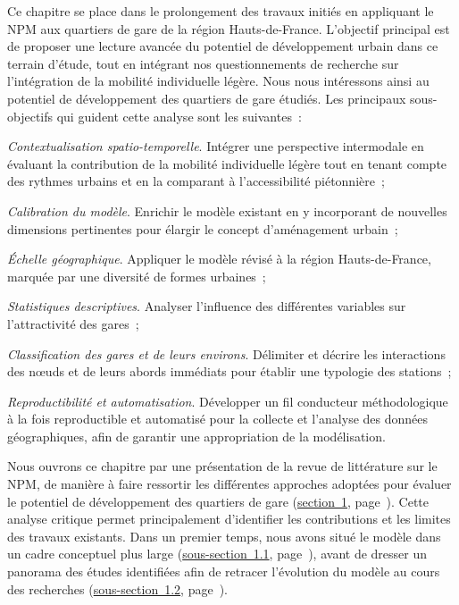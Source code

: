 \begin{refsegment}
Ce chapitre se place dans le prolongement des travaux initiés en appliquant le \acrshort{NPM} aux quartiers de gare de la région Hauts-de-France. L’objectif principal est de proposer une lecture avancée du potentiel de développement urbain dans ce terrain d'étude, tout en intégrant nos questionnements de recherche sur l’intégration de la mobilité individuelle légère. Nous nous intéressons ainsi au potentiel de développement des quartiers de gare étudiés. Les principaux sous-objectifs qui guident cette analyse sont les suivantes~:
\begin{customitemize}
    \item \textsl{Contextualisation spatio-temporelle}. Intégrer une perspective intermodale en évaluant la contribution de la mobilité individuelle légère tout en tenant compte des rythmes urbains et en la comparant à l’accessibilité piétonnière~;
    \item \textsl{Calibration du modèle}. Enrichir le modèle existant en y incorporant de nouvelles dimensions pertinentes pour élargir le concept d’aménagement urbain~;
    \item \textsl{Échelle géographique}. Appliquer le modèle révisé à la région Hauts-de-France, marquée par une diversité de formes urbaines~;
    \item \textsl{Statistiques descriptives}. Analyser l’influence des différentes variables sur l’attractivité des gares~;
    \item \textsl{Classification des gares et de leurs environs}. Délimiter et décrire les interactions des nœuds et de leurs abords immédiats pour établir une typologie des stations~;
    \item \textsl{Reproductibilité et automatisation}. Développer un fil conducteur méthodologique à la fois reproductible et automatisé pour la collecte et l’analyse des données géographiques, afin de garantir une appropriation de la modélisation.
\end{customitemize}%

Nous ouvrons ce chapitre par une présentation de la revue de littérature sur le \acrshort{NPM}, de manière à faire ressortir les différentes approches adoptées pour évaluer le potentiel de développement des quartiers de gare (\hyperref[chap6:revue-litterature-m-tod-index]{section~1}, page~\pageref{chap6:revue-litterature-m-tod-index}). Cette analyse critique permet principalement d'identifier les contributions et les limites des travaux existants. Dans un premier temps, nous avons situé le modèle dans un cadre conceptuel plus large (\hyperref[chap6:litterature-concept]{sous-section~1.1}, page~\pageref{chap6:litterature-concept}), avant de dresser un panorama des études identifiées afin de retracer l'évolution du modèle au cours des recherches (\hyperref[chap6:litterature-etat-art]{sous-section~1.2}, page~\pageref{chap6:litterature-etat-art}).


\end{refsegment}
